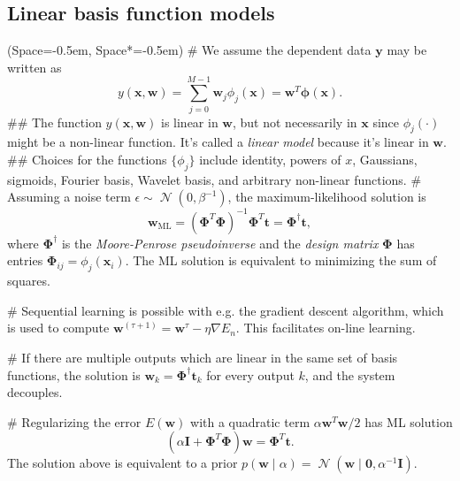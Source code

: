\documentclass[12pt, a4paper]{article}
\newcommand{\listSpace}{-0.5em}%
\newcommand{\vect}[1]{\bm{#1}}
\DeclareMathOperator{\N}{\mathcal{N}}
\begin{document}
\subsection*{Linear basis function models}
\begin{easylist}[itemize]
	\ListProperties(Space=\listSpace, Space*=\listSpace)
	# We assume the dependent data $\vect{y}$ may be written as
	\begin{equation*}
	y(\vect{x}, \vect{w}) = \sum_{j = 0}^{M-1} \vect{w}_j \phi_j(\vect{x}) = \vect{w}^T \vect{\phi}(\vect{x}).
	\end{equation*}
	## The function $y(\vect{x}, \vect{w})$ is linear in $\vect{w}$, but not necessarily in $\vect{x}$ since $\phi_j (\cdot)$ might be a non-linear function.
	It's called a \emph{linear model} because it's linear in $\vect{w}$.
	## Choices for the functions $\{ \phi_j \}$ include identity, powers of $x$, Gaussians, sigmoids, Fourier basis, Wavelet basis, and arbitrary non-linear functions.
	# Assuming a noise term $\epsilon \sim \N(0, \beta^{-1})$, the maximum-likelihood solution is
	\begin{equation*}
	\vect{w}_\text{ML} = \left(\vect{\Phi}^T \vect{\Phi} \right)^{-1} \vect{\Phi}^T \vect{t} = \vect{\Phi}^\dagger \vect{t},
	\end{equation*}
	where $\vect{\Phi}^\dagger$ is the \emph{Moore-Penrose pseudoinverse} and the \emph{design matrix} $\vect{\Phi}$ has entries $\vect{\Phi}_{ij} = \phi_j(\vect{x}_i)$.
	The ML solution is equivalent to minimizing the sum of squares.
	
	# Sequential learning is possible with e.g. the gradient descent algorithm, which is used to compute $\vect{w}^{(\tau + 1)} = \vect{w}^{\tau} - \eta \nabla E_n$.
	This facilitates on-line learning.
	
	# If there are multiple outputs which are linear in the same set of basis functions, the solution is $\vect{w}_k = \vect{\Phi}^\dagger \vect{t}_k$ for every output $k$, and the system decouples.
	
	# Regularizing the error $E(\vect{w})$ with a quadratic term $\alpha \vect{w}^T \vect{w} /2$ has ML solution
	\begin{equation*}
	\left( \alpha \vect{I} + \vect{\Phi}^T \vect{\Phi} \right)
	\vect{w}
	=
	\vect{\Phi}^T \vect{t}.
	\end{equation*}
	The solution above is equivalent to a prior $p(\vect{w} \mid \alpha) = \N (\vect{w} \mid  \vect{0}, \alpha^{-1} \vect{I})$.
\end{easylist}
\end{document}
